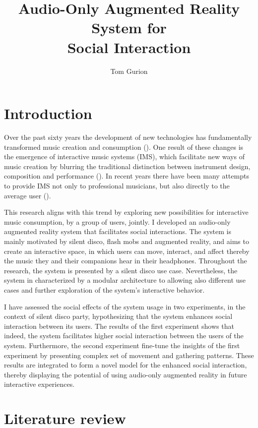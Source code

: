 \documentclass[a4paper,11pt]{article}
\title{Audio-Only Augmented Reality System for\\Social Interaction}
\author{Tom Gurion}
\begin{document}
\maketitle

\tableofcontents

\section{Introduction}

Over the past sixty years the development of new technologies has fundamentally transformed music creation and consumption (\cite{hargreaves99}).
One result of these changes is the emergence of interactive music systems (IMS), which facilitate new ways of music creation by blurring the traditional distinction between instrument design, composition and performance (\cite{drummond09}).
In recent years there have been many attempts to provide IMS not only to professional musicians, but also directly to the average user (\cite{stimulant13}).

This research aligns with this trend by exploring new possibilities for interactive music consumption, by a group of users, jointly.
I developed an audio-only augmented reality system that facilitates social interactions.
The system is mainly motivated by silent disco, flash mobs and augmented reality, and aims to create an interactive space, in which users can move, interact, and affect thereby the music they and their companions hear in their headphones.
Throughout the research, the system is presented by a silent disco use case.
Nevertheless, the system in characterized by a modular architecture to allowing also different use cases and further exploration of the system's interactive behavior.

I have assessed the social effects of the system usage in two experiments, in the context of silent disco party, hypothesizing that the system enhances social interaction between its users.
The results of the first experiment shows that indeed, the system facilitates higher social interaction between the users of the system.
Furthermore, the second experiment fine-tune the insights of the first experiment by presenting complex set of movement and gathering patterns.
These results are integrated to form a novel model for the enhanced social interaction, thereby displaying the potential of using audio-only augmented reality in future interactive experiences.

\section{Literature review}
\end{document}
